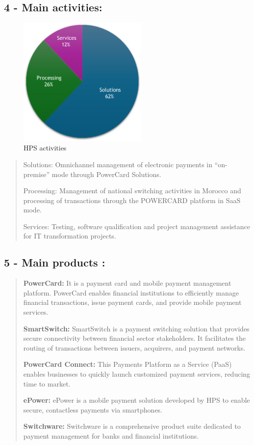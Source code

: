 \documentclass[12pt,a4paper]{report}
\begin{document}
\clearpage
\subsection{4 - Main activities:}

\begin{figure}[H]
\centering
\includegraphics[width=2.5in]{media/spsHPS.png}
\caption{HPS activities}
\label{fig:spsHPS}
\end{figure}

\begin{quote}
Solutions: Omnichannel management of electronic payments in ``on-premise'' mode through PowerCard Solutions.

Processing: Management of national switching activities in Morocco and processing of transactions through the POWERCARD platform in SaaS mode.

Services: Testing, software qualification and project management assistance for IT transformation projects.
\end{quote}

\subsection{5 - Main products :}

\begin{quote}
\textbf{PowerCard:} It is a payment card and mobile payment management platform. PowerCard enables financial institutions to efficiently manage financial transactions, issue payment cards, and provide mobile payment services.

\textbf{SmartSwitch:} SmartSwitch is a payment switching solution that provides secure connectivity between financial sector stakeholders. It facilitates the routing of transactions between issuers, acquirers, and payment networks.

\textbf{PowerCard Connect:} This Payments Platform as a Service (PaaS) enables businesses to quickly launch customized payment services, reducing time to market.

\textbf{ePower:} ePower is a mobile payment solution developed by HPS to enable secure, contactless payments via smartphones.

\textbf{Switchware:} Switchware is a comprehensive product suite dedicated to payment management for banks and financial institutions.
\end{quote}
\end{document}
